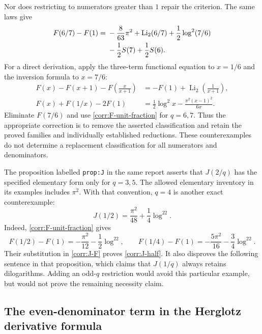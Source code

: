 \documentclass[11pt,a4paper]{article}
\theoremstyle{definition}
\theoremstyle{remark}
\numberwithin{equation}{section}
\begin{document}
Nor does restricting to numerators greater than $1$ repair the criterion.
The same laws give
\begin{align}
 F(6/7)-F(1)={}&-\frac8{63}\pi^2+\operatorname{Li}_2(6/7)
       +\frac12\log^2(7/6)\notag\\
       &-\frac12S(7)+\frac12S(6).
 \label{corr:F-six-sevenths}
\end{align}
For a direct derivation, apply the three-term functional equation to
$x=1/6$ and the inversion formula to $x=7/6$:
\begin{align*}
 F(x)-F(x+1)-F\left(\frac{x}{x+1}\right)
   &=-F(1)+\operatorname{Li}_2\left(\frac1{x+1}\right),\\
 F(x)+F(1/x)-2F(1)
   &=\frac12\log^2x-\frac{\pi^2(x-1)^2}{6x}.
\end{align*}
Eliminate $F(7/6)$ and use \eqref{corr:F-unit-fraction} for $q=6,7$.
Thus the appropriate correction is to remove the asserted
classification and retain the proved families and individually
established reductions.  These counterexamples do not determine a
replacement classification for all numerators and denominators.

The proposition labelled \texttt{prop:J} in the same report asserts
that $J(2/q)$ has the specified elementary form only for $q=3,5$.
The allowed elementary inventory in its examples includes $\pi^2$.
With that convention, $q=4$ is another exact counterexample:
\begin{equation}\label{corr:J-half}
 \boxed{\displaystyle J(1/2)=\frac{\pi^2}{48}
                                  +\frac14\log^22.}
\end{equation}
Indeed, \eqref{corr:F-unit-fraction} gives
\[
 F(1/2)-F(1)=-\frac{\pi^2}{12}-\frac12\log^22,
 \qquad
 F(1/4)-F(1)=-\frac{5\pi^2}{16}-\frac34\log^22.
\]
Their substitution in \eqref{corr:J-F} proves \eqref{corr:J-half}.
It also disproves the following sentence in that proposition, which
claims that $J(1/q)$ always retains dilogarithms.  Adding an odd-$q$
restriction would avoid this particular example, but would not prove
the remaining necessity claim.

\subsection{The even-denominator term in the Herglotz derivative formula}
\label{corr:herglotz-derivative}
\end{document}
